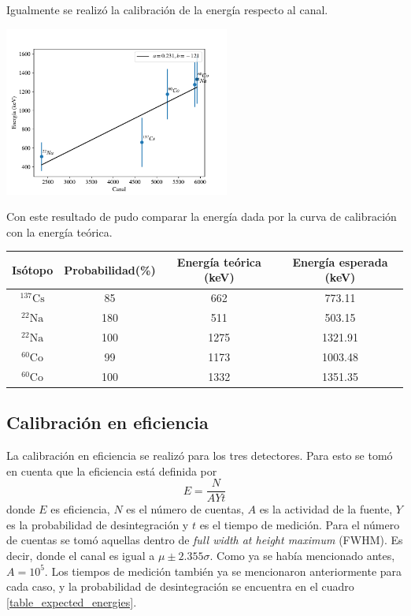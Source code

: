 \documentclass[a4paper, onecolumn]{article}
\begin{document}
		Igualmente se realizó la calibración de la energía respecto al canal.

		\begin{center}
			\includegraphics[width=210pt]{img/cal_bgo.pdf}
		\end{center}

		Con este resultado de pudo comparar la energía dada por la curva de calibración con la energía teórica.

		\begin{center}
			{\renewcommand{\arraystretch}{1.5}
			\renewcommand{\tabcolsep}{0.2cm}
			\label{table_expected_energies}
			\begin{tabular}{ c c c c }
				\hline
				Isótopo & Probabilidad(\%) & Energía teórica (keV) & Energía esperada (keV) \\
				\hline
				${}^{137}\mathrm{Cs}$ & 85 & 662 & 773.11\\ 
				${}^{22}\mathrm{Na}$ & 180 & 511 & 503.15\\ 
				${}^{22}\mathrm{Na}$ & 100 & 1275 & 1321.91 \\ 
				${}^{60}\mathrm{Co}$ & 99 & 1173 & 1003.48 \\ 
				${}^{60}\mathrm{Co}$ & 100 & 1332 & 1351.35
			\end{tabular}}
		\end{center}

		\subsection{Calibración en eficiencia}

		La calibración en eficiencia se realizó para los tres detectores. Para esto se tomó en cuenta que la eficiencia está definida por
		$$
		E = \frac{N}{AYt}
		$$
		donde $E$ es eficiencia, $N$ es el número de cuentas, $A$ es la actividad de la fuente, $Y$ es la probabilidad de desintegración y $t$ es el tiempo de medición. Para el número de cuentas se tomó aquellas dentro de {\it full width at height maximum} (FWHM). Es decir, donde el canal es igual a $\mu\pm2.355\sigma$. Como ya se había mencionado antes, $A=10^5$. Los tiempos de medición también ya se mencionaron anteriormente para cada caso, y la probabilidad de desintegración se encuentra en el cuadro \ref{table_expected_energies}.
\end{document}
